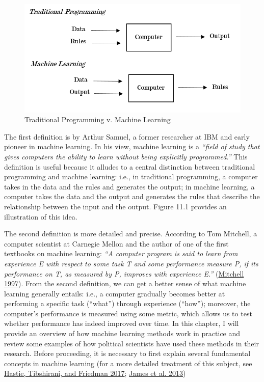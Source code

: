 \documentclass{book}
\begin{document}
\begin{figure}
\centering
\includegraphics{images/ml/jl-figure1.png}
\caption{Traditional Programming v. Machine Learning}
\end{figure}

The first definition is by Arthur Samuel, a former researcher at IBM and early
pioneer in machine learning. In his view, machine learning is a \emph{``field
of study that gives computers the ability to learn without being explicitly
programmed.''} This definition is useful because it alludes to a central
distinction between traditional programming and machine learning: i.e., in
traditional programming, a computer takes in the data and the rules and
generates the output; in machine learning, a computer takes the data and the
output and generates the rules that describe the relationship between the
input and the output. Figure 11.1 provides an illustration of this idea.

The second definition is more detailed and precise. According to Tom Mitchell,
a computer scientist at Carnegie Mellon and the author of one of the first
textbooks on machine learning: \emph{``A computer program is said to learn
from experience E with respect to some task T and some performance measure P,
if its performance on T, as measured by P, improves with experience E.''}
(\protect\hyperlink{ref-mitchell1997a}{Mitchell 1997}). From the second
definition, we can get a better sense of what machine learning generally
entails: i.e., a computer gradually becomes better at performing a specific
task (``what'') through experience (``how''); moreover, the computer's
performance is measured using some metric, which allows us to test whether
performance has indeed improved over time. In this chapter, I will provide an
overview of how machine learning methods work in practice and review some
examples of how political scientists have used these methods in their
research. Before proceeding, it is necessary to first explain several
fundamental concepts in machine learning (for a more detailed treatment of
this subject, see \protect\hyperlink{ref-hastie2017a}{Hastie, Tibshirani, and
Friedman 2017}; \protect\hyperlink{ref-james2013a}{James et al. 2013})
\end{document}
